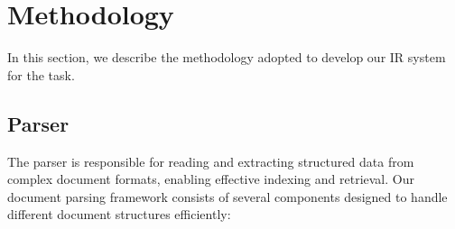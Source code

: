 \section{Methodology}
\label{sec:methodology}

In this section, we describe the methodology adopted to develop our IR system for the task.

\subsection{Parser}
The parser is responsible for reading and extracting structured data from complex document formats, enabling effective indexing and retrieval. Our document parsing framework consists of several components designed to handle different document structures efficiently:

